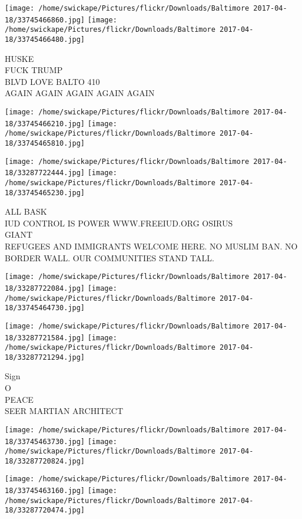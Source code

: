 \documentclass[10pt,letterpaper]{article}
\begin{document}
\texttt{[image: /home/swickape/Pictures/flickr/Downloads/Baltimore 2017-04-18/33745466860.jpg]}
\texttt{[image: /home/swickape/Pictures/flickr/Downloads/Baltimore 2017-04-18/33745466480.jpg]}

HUSKE\\
FUCK TRUMP\\
BLVD LOVE BALTO 410\\
AGAIN AGAIN AGAIN AGAIN AGAIN\\
\pagebreak

\texttt{[image: /home/swickape/Pictures/flickr/Downloads/Baltimore 2017-04-18/33745466210.jpg]}
\texttt{[image: /home/swickape/Pictures/flickr/Downloads/Baltimore 2017-04-18/33745465810.jpg]}

\texttt{[image: /home/swickape/Pictures/flickr/Downloads/Baltimore 2017-04-18/33287722444.jpg]}
\texttt{[image: /home/swickape/Pictures/flickr/Downloads/Baltimore 2017-04-18/33745465230.jpg]}

ALL BASK\\
IUD CONTROL IS POWER WWW.FREEIUD.ORG OSIRUS\\
GIANT\\
REFUGEES AND IMMIGRANTS WELCOME HERE.  NO MUSLIM BAN.  NO BORDER WALL.  OUR COMMUNITIES STAND TALL.\\
\pagebreak

\texttt{[image: /home/swickape/Pictures/flickr/Downloads/Baltimore 2017-04-18/33287722084.jpg]}
\texttt{[image: /home/swickape/Pictures/flickr/Downloads/Baltimore 2017-04-18/33745464730.jpg]}

\texttt{[image: /home/swickape/Pictures/flickr/Downloads/Baltimore 2017-04-18/33287721584.jpg]}
\texttt{[image: /home/swickape/Pictures/flickr/Downloads/Baltimore 2017-04-18/33287721294.jpg]}

Sign\\
O\\
PEACE\\
SEER MARTIAN ARCHITECT\\
\pagebreak

\texttt{[image: /home/swickape/Pictures/flickr/Downloads/Baltimore 2017-04-18/33745463730.jpg]}
\texttt{[image: /home/swickape/Pictures/flickr/Downloads/Baltimore 2017-04-18/33287720824.jpg]}

\texttt{[image: /home/swickape/Pictures/flickr/Downloads/Baltimore 2017-04-18/33745463160.jpg]}
\texttt{[image: /home/swickape/Pictures/flickr/Downloads/Baltimore 2017-04-18/33287720474.jpg]}
\end{document}
